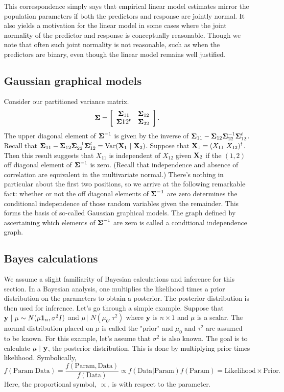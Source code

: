 This correspondence simply says that empirical linear model estimates mirror the population parameters if both the predictors and response are jointly normal. It also yields
a motivation for the linear model in some cases where the joint normality of the
predictor and response is conceptually reasonable. Though we note that often such
joint normality is not reasonable, such as when the predictors are binary, even
though the linear model remains well justified. 

\subsection{Gaussian graphical models}
Consider our partitioned variance matrix. 
$$
\boldsymbol{\Sigma} = \left[
\begin{array}{cc}
\boldsymbol{\Sigma}_{11} & \boldsymbol{\Sigma}_{12} \\
\boldsymbol{\Sigma}{12}^t & \boldsymbol{\Sigma}_{22}
\end{array}
\right].
$$
The upper diagonal element of $\boldsymbol{\Sigma}^{-1}$ is given by  the inverse of 
$\boldsymbol{\Sigma}_{11} - \boldsymbol{\Sigma}_{12} \boldsymbol{\Sigma}_{22}^{-1} \boldsymbol{\Sigma}_{12}^t$. Recall that
$\boldsymbol{\Sigma}_{11} - \boldsymbol{\Sigma}_{12} \boldsymbol{\Sigma}_{22}^{-1} \boldsymbol{\Sigma}_{12}^t = \mbox{Var}(\mathbf{X}_1 ~|~ \mathbf{X}_2)$. Suppose that
$\mathbf{X}_1 = (X_{11} ~ X_{12})^t$. Then this result suggests that
$X_{11}$ is independent of $X_{12}$ given $\mathbf{X}_2$ if the $(1,2)$ off diagonal element
of $\boldsymbol{\Sigma}^{-1}$ is zero. (Recall that independence and absence of correlation are
equivalent in the multivariate normal.) There's nothing in particular about the
first two positions, so we arrive at the following remarkable fact: whether or not
the off diagonal elements of $\boldsymbol{\Sigma}^{-1}$ are zero determines the conditional
independence of those random variables given the remainder. This forms the
basis of so-called Gaussian graphical models. The graph defined by ascertaining
which elements of $\boldsymbol{\Sigma}^{-1}$ are zero is called a conditional independence graph.



\subsection{Bayes calculations}
We assume a slight familiarity of Bayesian calculations and inference for this section.
In a Bayesian analysis, one multiplies the likelihood times a prior distribution
on the parameters to obtain a posterior. The posterior distribution is then used for
inference. Let's go through a simple example.
Suppose that $\mathbf{y} ~|~ \mu \sim N(\mu \mathbf{1}_n, \sigma^2 I)$ and
$\mu ~|~ N(\mu_0, \tau^2)$ where $\mathbf{y}$ is $n \times 1$ and $\mu$ is a scalar. The
normal distribution placed on $\mu$ is called the "prior" and $\mu_0$ and $\tau^2$ 
are assumed to be known. For this example, let's assume that $\sigma^2$ is also
known. The goal is to calculate
$\mu ~|~ \mathbf{y}$, the posterior distribution. This is done by multiplying prior times
likelihood. Symbolically,
$$
f(\mbox{Param} | \mbox{Data}) = \frac{f(\mbox{Param}, \mbox{Data})}{f(\mbox{Data})} 
\propto f(\mbox{Data} | \mbox{Param}) f(\mbox{Param}) = \mbox{Likelihood} \times \mbox{Prior}.
$$
Here, the proportional symbol, $\propto$, is with respect to the parameter.

